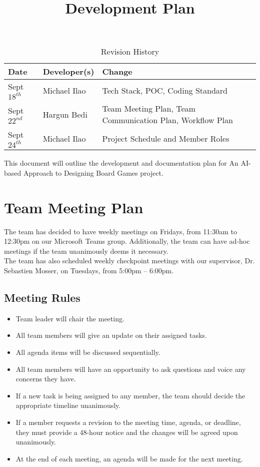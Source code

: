 \documentclass{article}
\title{Development Plan\\\progname}
\author{\authname}
\date{}
\begin{document}
\begin{table}[hp]
\caption{Revision History} \label{TblRevisionHistory}
\begin{tabularx}{\textwidth}{llX}
\toprule
\textbf{Date} & \textbf{Developer(s)} & \textbf{Change}\\
\midrule
Sept $18^{th}$ & Michael Ilao & Tech Stack, POC, Coding Standard\\
Sept $22^{nd}$ & Hargun Bedi & Team Meeting Plan, Team Communication Plan, Workflow Plan\\
Sept $24^{th}$ & Michael Ilao & Project Schedule and Member Roles\\
\bottomrule
\end{tabularx}
\end{table}

\newpage

\maketitle

This document will outline the development and documentation plan for An AI-based Approach to Designing Board Games project.
\section{Team Meeting Plan}
The team has decided to have weekly meetings on Fridays, from 11:30am to 12:30pm on our Microsoft Teams group. Additionally, the team can have ad-hoc meetings if the team unanimously deems it necessary. 
\\The team has also scheduled weekly checkpoint meetings with our supervisor, Dr. Sebastien Mosser, on Tuesdays, from 5:00pm – 6:00pm. 
\subsection{Meeting Rules}
\begin{itemize}
    \item Team leader will chair the meeting.
    \item All team members will give an update on their assigned tasks.
    \item All agenda items will be discussed sequentially.
    \item All team members will have an opportunity to ask questions and voice any concerns they have.
    \item If a new task is being assigned to any member, the team should decide the appropriate timeline unanimously. 
    \item If a member requests a revision to the meeting time, agenda, or deadline, they must provide a 48-hour notice and the changes will be agreed upon unanimously.
    \item At the end of each meeting, an agenda will be made for the next meeting. 
\end{itemize}
\end{document}
